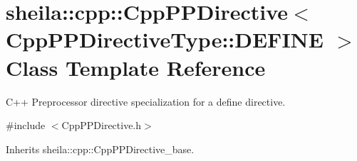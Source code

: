\hypertarget{classsheila_1_1cpp_1_1CppPPDirective_3_01CppPPDirectiveType_1_1DEFINE_01_4}{}\section{sheila\+:\+:cpp\+:\+:Cpp\+P\+P\+Directive$<$ Cpp\+P\+P\+Directive\+Type\+:\+:D\+E\+F\+I\+NE $>$ Class Template Reference}
\label{classsheila_1_1cpp_1_1CppPPDirective_3_01CppPPDirectiveType_1_1DEFINE_01_4}


C++ Preprocessor directive specialization for a define directive.  




{\ttfamily \#include $<$Cpp\+P\+P\+Directive.\+h$>$}



Inherits sheila\+::cpp\+::\+Cpp\+P\+P\+Directive\+\_\+base.

